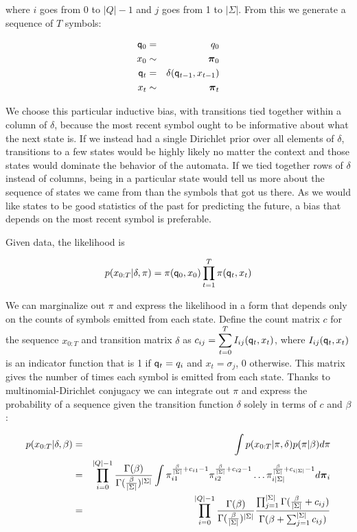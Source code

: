 where $i$ goes from 0 to $|Q|-1$ and $j$ goes from 1 to $|\Sigma|$.  From this we generate a sequence of $T$ symbols:

\begin{eqnarray}
\q_0 & = & q_0 \label{gen:q0} \\
x_0 & \sim & \bpi_0 \label{gen:x0} \\
\q_t & = & \delta(\q_{t-1},x_{t-1}) \label{gen:q} \\
x_t & \sim & \bpi_t \label{gen:x}
\end{eqnarray}

We choose this particular inductive bias, with transitions tied together within a column of $\delta$, because the most recent symbol ought to be informative about what the next state is.  If we instead had a single Dirichlet prior over all elements of $\delta$, transitions to a few states would be highly likely no matter the context and those states would dominate the behavior of the automata.  If we tied together rows of $\delta$ instead of columns, being in a particular state would tell us more about the sequence of states we came from than the symbols that got us there.  As we would like states to be good statistics of the past for predicting the future, a bias that depends on the most recent symbol is preferable.

Given data, the likelihood is

\[ p(x_{0:T}|\delta,\pi) = \pi(\q_0,x_0)\prod_{t=1}^T \pi(\q_t,x_t) \label{x:def} \]

We can marginalize out $\pi$ and express the likelihood in a form that depends only on the counts of symbols emitted from each state.  Define the count matrix $c$ for the sequence $x_{0:T}$ and transition matrix $\delta$ as $c_{ij} = \displaystyle\sum_{t=0}^T I_{ij}(\q_t,x_t)$, where $I_{ij}(\q_t,x_t)$ is an indicator function that is 1 if $\q_t = q_i$ and $x_t = \sigma_j$, 0 otherwise. This matrix gives the number of times each symbol is emitted from each state.  Thanks to multinomial-Dirichlet conjugacy we can integrate out $\pi$ and express the probability of a sequence given the transition function $\delta$ solely in terms of $c$ and $\beta$:

\begin{eqnarray}
 p(x_{0:T}|\delta,\beta) & = & \int p(x_{0:T}|\pi,\delta) p(\pi|\beta) d\pi \label{x:factor} \\
 & = &  \prod_{i=0}^{|Q|-1} \frac{\Gamma(\beta)}{\Gamma(\frac{\beta}{|\Sigma|})^{|\Sigma|}} \int\pi_{i1}^{\frac{\beta}{|\Sigma|}+c_{i1}-1} \pi_{i2}^{\frac{\beta}{|\Sigma|}+c_{i2}-1} \ldots \pi_{i|\Sigma|}^{\frac{\beta}{|\Sigma|}+c_{i|\Sigma|}-1} d\bpi_i \label{x:int}\\
 & = & \prod_{i=0}^{|Q|-1} \frac{\Gamma(\beta)}{\Gamma(\frac{\beta}{|\Sigma|})^{|\Sigma|}} \frac{\prod_{j=1}^{|\Sigma|}\Gamma(\frac{\beta}{|\Sigma|} + c_{ij})}{\Gamma(\beta + \sum_{j=1}^{|\Sigma|} c_{ij})} \label{x:end}
 \end{eqnarray}
 
